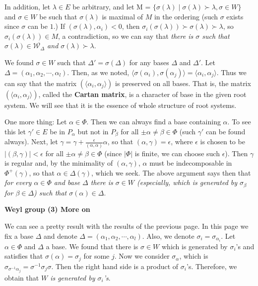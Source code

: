 \documentclass{article}
\newcommand{\SBar}{\;|\;}
\begin{document}
In addition, let $\lambda \in E$ be arbitrary, and let M = $\{\sigma(\lambda) \SBar \sigma(\lambda) \succ \lambda, \sigma \in W\}$ and $\sigma \in W$ be such that $\sigma(\lambda)$ is maximal of $M$ in the ordering (such $\sigma$ exists since $\sigma$ can be $1$.)
If $(\sigma(\lambda), \alpha_i) < 0$, then $\sigma_i(\sigma(\lambda)) \succ \sigma(\lambda) \succ \lambda$, so $\sigma_i(\sigma(\lambda)) \in M$, a contradiction, so we can say that \textit{there is $\sigma$ such that $\sigma(\lambda) \in \overline{\mathcal{W}_\Delta}$ and $\sigma(\lambda) \succ \lambda$}.

We found $\sigma \in W$ such that $\Delta' = \sigma(\Delta)$ for any bases $\Delta$ and $\Delta'$.
Let $\Delta = (\alpha_1, \alpha_2, \cdots, \alpha_l)$.
Then, as we noted, $\langle \sigma(\alpha_i), \sigma(\alpha_j) \rangle = \langle \alpha_i, \alpha_j \rangle$.
Thus we can say that the matrix $(\langle \alpha_i, \alpha_j \rangle)$ is preserved on all bases.
That is, the matrix $(\langle \alpha_i, \alpha_j \rangle)$, called the \textbf{Cartan matrix}, is a character of base in the given root system.
We will see that it is the essence of whole structure of root systems.

One more thing: Let $\alpha \in \Phi$.
Then we can always find a base containing $\alpha$.
To see this let $\gamma' \in E$ be in $P_\alpha$ but not in $P_\beta$ for all $\pm \alpha \ne \beta \in \Phi$ (such $\gamma'$ can be found always).
Next, let $\gamma = \gamma + \frac{\epsilon}{(\alpha, \alpha)} \alpha$, so that $(\alpha, \gamma) = \epsilon$, where $\epsilon$ is chosen to be $|(\beta, \gamma)| < \epsilon$ for all $\pm \alpha \ne \beta \in \Phi$ (since $|\Phi|$ is finite, we can choose such $\epsilon$).
Then $\gamma$ is regular and, by the minimality of $(\alpha, \gamma)$, $\alpha$ must be indecomposable in $\Phi^+(\gamma)$, so that $\alpha \in \Delta(\gamma)$, which we seek.
The above argument says then that \textit{for every $\alpha \in \Phi$ and base $\Delta$ there is $\sigma \in W$ (especially, which is generated by $\sigma_\beta$ for $\beta \in \Delta$) such that $\sigma(\alpha) \in \Delta$}.

\newpage

\textbf{Weyl group (3) More on}

We can see a pretty result with the results of the previous page.
In this page we fix a base $\Delta$ and denote $\Delta = (\alpha_1, \alpha_2, \cdots, \alpha_l)$.
Also, we denote $\sigma_i = \sigma_{\alpha_i}$.
Let $\alpha \in \Phi$ and $\Delta$ a base.
We found that there is $\sigma \in W$ which is generated by $\sigma_i$'s and satisfies that $\sigma(\alpha) = \sigma_j$ for some $j$.
Now we consider $\sigma_\alpha$, which is $\sigma_{\sigma^{-1} \alpha_j} = \sigma^{-1} \sigma_j \sigma$.
Then the right hand side is a product of $\sigma_i$'s.
Therefore, we obtain that \textit{$W$ is generated by $\sigma_i$'s}.
\end{document}

